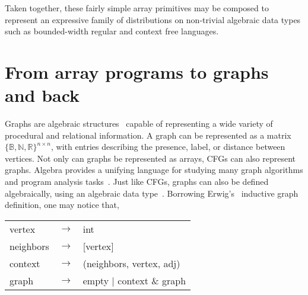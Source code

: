 \documentclass[sigplan,10pt,review,anonymous]{acmart}
\begin{document}
Taken together, these fairly simple array primitives may be composed to represent an expressive family of distributions on non-trivial algebraic data types such as bounded-width regular and context free languages.



%

\section{From array programs to graphs and back}\label{sec:graphs}

Graphs are algebraic structures~\cite{weisfeiler1968reduction} capable of representing a wide variety of procedural and relational information. A graph can be represented as a matrix $\{\mathbb{B}, \mathbb{N}, \mathbb{R}\}^{n\times n}$, with entries describing the presence, label, or distance between vertices. Not only can graphs be represented as arrays, CFGs can also represent graphs. Algebra provides a unifying language for studying many graph algorithms and program analysis tasks~\citep{kepner2011graph}. Just like CFGs, graphs can also be defined algebraically, using an algebraic data type~\cite{mokhov2017algebraic}. Borrowing Erwig's~\citep{erwig2001inductive} inductive graph definition, one may notice that,

  \begin{table}[H]
    \begin{tabular}{lcl}
      vertex  & $\rightarrow$ & int \\
      neighbors & $\rightarrow$ & [vertex] \\
      context & $\rightarrow$ & (neighbors, vertex, adj) \\
      graph   & $\rightarrow$ & empty | context \& graph \\
    \end{tabular}
  \end{table}
\end{document}
